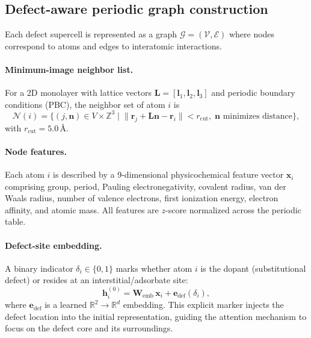 
\subsection{Defect-aware periodic graph construction}\label{sec:graph}

Each defect supercell is represented as a graph $\mathcal{G} = (\mathcal{V},
\mathcal{E})$ where nodes correspond to atoms and edges to interatomic
interactions.

\paragraph{Minimum-image neighbor list.}
For a 2D monolayer with lattice vectors $\mathbf{L} = [\mathbf{l}_1,
\mathbf{l}_2, \mathbf{l}_3]$ and periodic boundary conditions (PBC), the
neighbor set of atom $i$ is
\begin{equation}\label{eq:neighbors}
  \mathcal{N}(i) = \bigl\{(j, \mathbf{n}) \in V \times \mathbb{Z}^3
    \;\big|\; \|\mathbf{r}_j + \mathbf{L}\mathbf{n} - \mathbf{r}_i\|
    < r_\mathrm{cut},\; \mathbf{n}\text{ minimizes distance}\bigr\},
\end{equation}
with $r_\mathrm{cut} = 5.0$\,\AA{}.

\paragraph{Node features.}
Each atom $i$ is described by a 9-dimensional physicochemical feature vector
$\mathbf{x}_i$ comprising group, period, Pauling electronegativity, covalent
radius, van der Waals radius, number of valence electrons, first ionization
energy, electron affinity, and atomic mass.
All features are $z$-score normalized across the periodic table.

\paragraph{Defect-site embedding.}
A binary indicator $\delta_i \in \{0, 1\}$ marks whether atom $i$ is the
dopant (substitutional defect) or resides at an interstitial/adsorbate site:
\begin{equation}\label{eq:defect_embed}
  \mathbf{h}_i^{(0)} = \mathbf{W}_\mathrm{emb}\,\mathbf{x}_i
    + \mathbf{e}_\mathrm{def}(\delta_i),
\end{equation}
where $\mathbf{e}_\mathrm{def}$ is a learned $\mathbb{R}^2 \to \mathbb{R}^d$
embedding.
This explicit marker injects the defect location into the initial
representation, guiding the attention mechanism to focus on the defect core
and its surroundings.

